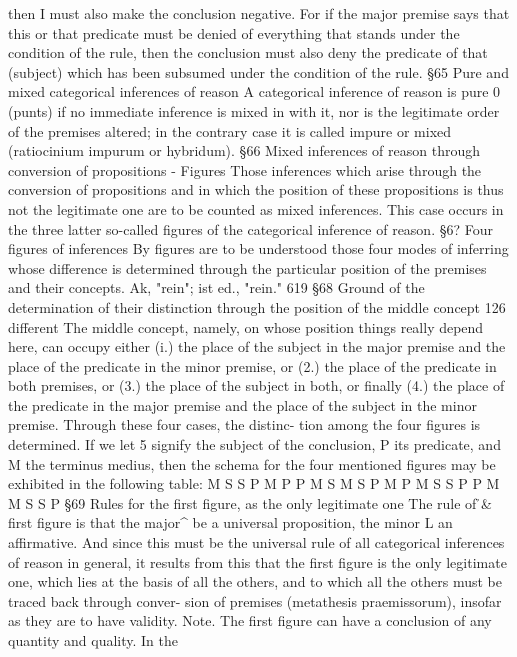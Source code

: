 then I must also make the conclusion negative. For if the major premise
says that this or that predicate must be denied of everything that stands
under the condition of the rule, then the conclusion must also deny the
predicate of that (subject) which has been subsumed under the condition
of the rule.
§65
Pure and mixed categorical inferences of reason
A categorical inference of reason is pure 0 (punts) if no immediate inference
is mixed in with it, nor is the legitimate order of the premises altered; in
the contrary case it is called impure or mixed (ratiocinium impurum or
hybridum).
§66
Mixed inferences of reason through conversion of
propositions - Figures
Those inferences which arise through the conversion of propositions and
in which the position of these propositions is thus not the legitimate one
are to be counted as mixed inferences. This case occurs in the three latter
so-called figures of the categorical inference of reason.
§6?
Four figures of inferences
By figures are to be understood those four modes of inferring whose
difference is determined through the particular position of the premises
and their concepts.
Ak, "rein"; ist ed., "rein."
619
§68
Ground of the determination of their distinction through the
position of the middle concept
126
different
The middle concept, namely, on whose position things really depend
here, can occupy either (i.) the place of the subject in the major premise
and the place of the predicate in the minor premise, or (2.) the place of the
predicate in both premises, or (3.) the place of the subject in both, or
finally (4.) the place of the predicate in the major premise and the place of
the subject in the minor premise. Through these four cases, the distinc-
tion among the four figures is determined. If we let 5 signify the subject of
the conclusion, P its predicate, and M the terminus medius, then the
schema for the four mentioned figures may be exhibited in the following
table:
M
S
S
P
M
P
P M
S M
S P
M P
M S
S P
P M
M S
S P
§69
Rules for the first figure, as the only legitimate one
The rule of \h& first figure is that the major^ be a universal proposition, the
minor L an affirmative. And since this must be the universal rule of all
categorical inferences of reason in general, it results from this that the
first figure is the only legitimate one, which lies at the basis of all the
others, and to which all the others must be traced back through conver-
sion of premises (metathesis praemissorum), insofar as they are to have
validity.
Note.
The first figure can have a conclusion of any quantity and quality. In the
